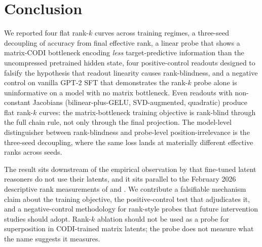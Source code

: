 \section{Conclusion}
\label{sec:conclusion}

We reported four flat rank-$k$ curves across training regimes, a
three-seed decoupling of accuracy from final effective rank, a
linear probe that shows a matrix-CODI bottleneck encoding
\emph{less} target-predictive information than the uncompressed
pretrained hidden state, four positive-control readouts designed to
falsify the hypothesis that readout linearity causes
rank-blindness, and a negative control on vanilla GPT-2 SFT that
demonstrates the rank-$k$ probe alone is uninformative on a model
with no matrix bottleneck. Even readouts with non-constant Jacobians
(bilinear-plus-GELU, SVD-augmented, quadratic) produce flat rank-$k$
curves: the matrix-bottleneck training objective is rank-blind through
the full chain rule, not only through the final projection. The
model-level distinguisher between rank-blindness and probe-level
position-irrelevance is the three-seed decoupling, where the same loss
lands at materially different effective ranks across seeds.

The result sits downstream of the empirical observation by
\citet{rizvi2026illusion} that fine-tuned latent reasoners do not
use their latents, and it sits parallel to the February 2026
descriptive rank measurements of \citet{nazari2026rank} and
\citet{anonymous2026staterank}. We contribute a falsifiable
mechanism claim about the training objective, the positive-control
test that adjudicates it, and a negative-control methodology for
rank-style probes that future intervention studies should adopt.
Rank-$k$ ablation should not be used as a probe for superposition in
CODI-trained matrix latents; the probe does not measure what the name
suggests it measures.
